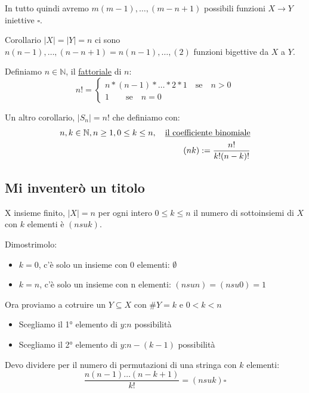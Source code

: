 \documentclass{article}
\begin{document}
In tutto quindi avremo $m(m-1),\ldots,(m-n+1)$ possibili funzioni $X \to Y$ iniettive $\square$. \par

Corollario $|X| = |Y| = n$ ci sono $n(n-1),\ldots,(n-n+1) = n(n-1),\ldots,(2)$ funzioni bigettive da $X$ a $Y$. \par
Definiamo $n \in \mathbb{N}$, il \underline{fattoriale} di $n$:
\[ n! = 
\begin{cases}
        n * (n-1) * \ldots * 2 * 1 \quad \mbox{se} \quad n>0\\
        1 \quad \quad \mbox{se} \quad n = 0
\end{cases}
\]

Un altro corollario, $|S_n| = n$! che definiamo con:
\begin{align*}
        n,k \in \mathbb{N}, n \ge 1, 0 \le k \le n, \quad \mbox{\underline{il coefficiente binomiale}} \\
        (n k) := \frac{n!}{k!(n-k)!}
\end{align*}



\subsection{Mi inventerò un titolo}
X insieme finito, $|X| = n$ per ogni intero $0 \le k \le n$ il numero di sottoinsiemi di $X$ con $k$ elementi è $(n su k)$.

Dimostrimolo:
\begin{itemize}
        \item $k=0$, c'è solo un insieme con 0 elementi: $\emptyset$
        \item $k=n$, c'è solo un insieme con n elementi: $(n su n) = (n su 0) = 1$
\end{itemize}


Ora proviamo a cotruire un $Y \subseteq X$ con $\#Y = k$ e $0 < k < n$ \par
\begin{itemize}
        \item Scegliamo il 1° elemento di $y$:$n$ possibilità
        \item Scegliamo il 2° elemento di $y$:$n-(k-1)$ possibilità
\end{itemize}

Devo dividere per il numero di permutazioni di una stringa con $k$ elementi:
\begin{equation*}
        \frac{n(n-1)\ldots(n-k+1)}{k!} = (n su k) \square
\end{equation*}
\end{document}

